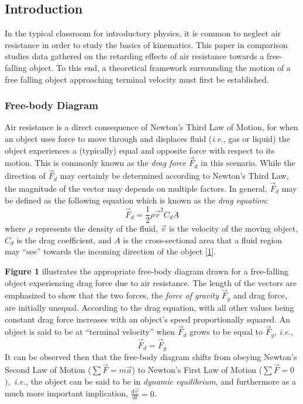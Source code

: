 \documentclass[12pt]{article}
\newcommand{\totder}[2][]{\frac{\mathrm{d}#1}{\mathrm{d}#2}} %
\newcommand{\dragforce}{\vec{F}_d}
\newcommand{\forceofgravity}{\vec{F}_g}
\begin{document}
\begin{multicols}{2}

\subsection{Introduction}
In the typical classroom for introductory physics,
it is common to neglect air resistance in order to study the basics of kinematics.
This paper in comparison studies data gathered on the retarding effects of air resistance towards a free-falling object.
To this end, a theoretical framework surrounding the motion of a free falling object approaching terminal velocity must first be established.

\subsubsection{Free-body Diagram}
Air resistance is a direct consequence of Newton's Third Law of Motion, for when an object uses force to move through and displaces fluid (\textit{i.e.}, gas or liquid) the object experiences a (typically) equal and opposite force with respect to its motion.
This is commonly known as the \textit{drag force} $\dragforce$ in this scenario.
While the direction of $\dragforce$ may certainly be determined according to Newton's Third Law, the magnitude of the vector may depends on multiple factors.
In general, $\dragforce$ may be defined as the following equation which is known as the \textit{drag equation}:
$$\dragforce=\frac{1}{2}\rho\vec{v}^2C_dA$$
where $\rho$ represents the density of the fluid, $\vec{v}$ is the velocity of the moving object, $C_d$ is the drag coefficient, and $A$ is the cross-sectional area that a fluid region may ``see'' towards the incoming direction of the object [\hyperref[sec:1]{1}].

\textbf{Figure 1} illustrates the appropriate free-body diagram drawn for a free-falling object experiencing drag force due to air resistance.
The length of the vectors are emphasized to show that the two forces, the \textit{force of gravity} $\forceofgravity$ and drag force, are initially unequal.
According to the drag equation, with all other values being constant drag force increases with an object's speed proportionally squared.
An object is said to be at ``terminal velocity'' when $\dragforce$ grows to be equal to $\forceofgravity$, \textit{i.e.,}
$$\dragforce=\forceofgravity$$
It can be observed then that the free-body diagram shifts from obeying Newton's Second Law of Motion ($\sum\vec{F}=m\vec{a}$) to Newton's First Law of Motion ($\sum\vec{F}=0$),\
\textit{i.e.,} the object can be said to be in \textit{dynamic equilibrium}, and furthermore as a much more important implication, $\displaystyle{\totder[\vec{v}]{t}}=0$.


\end{multicols}
\end{document}
